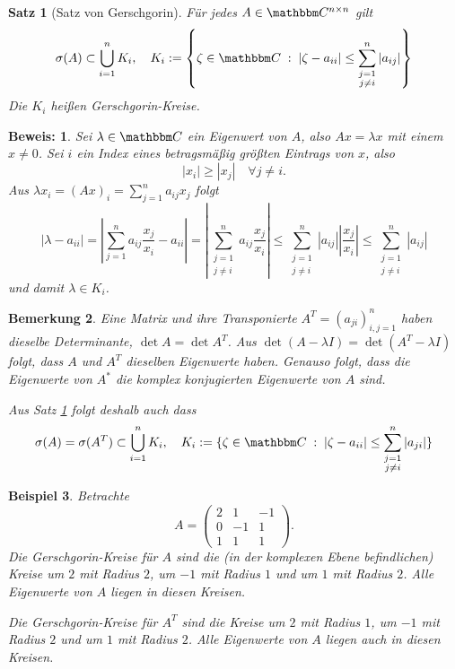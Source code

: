 \documentclass[12pt,a4paper]{book}
\theoremstyle{break}
\newtheorem{theorem}{Satz}[chapter]
\newtheorem{bemerkung}[theorem]{Bemerkung}
\newtheorem{beispiel}[theorem]{Beispiel}
\theoremstyle{nonumberplain}
\newtheorem{beweis}{Beweis:}
\newcommand{\C}{\mathbbm C}
\newcommand{\1}{\mathbbm{1}} 			      	%
\newcommand{\dd}{\; : \;}    			      	%
\begin{document}
\begin{theorem}[Satz von Gerschgorin]\label{satz:gerschgorin}
Für jedes $A\in \C^{n\times n}$ gilt
\[
\sigma(A)\subset \bigcup_{i=1}^n K_i, \quad K_i:=\left\{ \zeta\in \C \dd |\zeta-a_{ii}|\leq \sum_{\substack{j=1\\ j\neq i}}^n |a_{ij}| \right\}
\]
Die $K_i$ heißen Gerschgorin-Kreise.
\end{theorem}
\begin{beweis}
Sei $\lambda\in \C$ ein Eigenwert von $A$, also $Ax=\lambda x$ mit einem $x\neq 0$. Sei $i$ ein Index eines betragsmäßig
größten Eintrags von $x$, also
\[
|x_i|\geq |x_j| \quad \forall j\neq i.
\]
Aus $\lambda x_i=(Ax)_i=\sum_{j=1}^n a_{ij}x_j$
folgt
\[
| \lambda - a_{ii}| = \left| \sum_{j=1}^n a_{ij} \frac{x_j}{x_i} - a_{ii}\right| 
= \left| \sum_{\substack{j=1\\ j\neq i}}^n a_{ij} \frac{x_j}{x_i}\right| 
\leq  \sum_{\substack{j=1\\ j\neq i}}^n |a_{ij}| \left|\frac{x_j}{x_i}\right|\leq \sum_{\substack{j=1\\ j\neq i}}^n |a_{ij}|
\]
und damit $\lambda\in K_i$.
\end{beweis}

\begin{bemerkung}\label{Bem:Transponiert}
Eine Matrix und ihre Transponierte $A^T=(a_{ji})_{i,j=1}^n$ haben dieselbe Determinante, $\det A=\det A^T$. 
Aus $\det (A-\lambda I)=\det(A^T-\lambda I)$ folgt, dass $A$ und $A^T$ dieselben Eigenwerte haben.
Genauso folgt, dass die Eigenwerte von $A^*$ die komplex konjugierten Eigenwerte von $A$ sind.

Aus Satz \ref{satz:gerschgorin} folgt deshalb auch dass 
\[
\sigma(A)=\sigma(A^T)\subset \bigcup_{i=1}^n K_i, \quad K_i:=\{ \zeta\in \C \dd |\zeta-a_{ii}|\leq \sum_{\substack{j=1\\ j\neq i}}^n |a_{ji}| \}
\]
\end{bemerkung}

\begin{beispiel}
Betrachte 
\[
A=\begin{pmatrix} 2 & 1 & -1\\ 0 & -1 & 1\\ 1 & 1 & 1\end{pmatrix}.
\]
Die Gerschgorin-Kreise für $A$ sind die (in der komplexen Ebene befindlichen) Kreise um $2$ mit Radius $2$, um $-1$ mit Radius $1$
und um $1$ mit Radius $2$. Alle Eigenwerte von $A$ liegen in diesen Kreisen.

Die Gerschgorin-Kreise für $A^T$ sind die Kreise um $2$ mit Radius $1$, um $-1$ mit Radius $2$
und um $1$ mit Radius $2$. Alle Eigenwerte von $A$ liegen auch in diesen Kreisen.
\end{beispiel}
\end{document}
